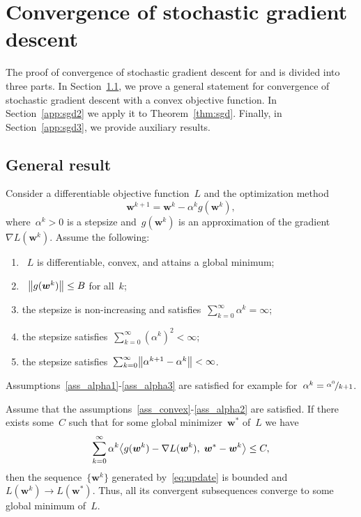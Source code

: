 \section{Convergence of stochastic gradient descent}

The proof of convergence of stochastic gradient descent for \PatMat and \PatMatNP is divided into three parts. In Section~\ref{app:sgd1}, we prove a general statement for convergence of stochastic gradient descent with a convex objective function. In Section~\ref{app:sgd2} we apply it to Theorem~\ref{thm:sgd}. Finally, in Section~\ref{app:sgd3}, we provide auxiliary results.

\subsection{General result}\label{app:sgd1}

Consider a differentiable objective function~$L$ and the optimization method
\begin{equation}\label{eq:update}
  \bm{w}^{k+1} = \bm{w}^k - \alpha^k g(\bm{w}^k),
\end{equation}
where~$\alpha^k > 0$ is a stepsize and~$g(\bm{w}^k)$ is an approximation of the gradient~$\nabla L(\bm{w}^k)$. Assume the following:
\begin{enumerate}[label={(\textbf{A\arabic*})}, left = 15pt]
  \item \label{ass_convex}~$L$ is differentiable, convex, and attains a global minimum;
  \item \label{ass_gbound}~$\norm{g(\bm{w}^k)}\leq B$ for all~$k$;
  \item \label{ass_alpha1} the stepsize is non-increasing and satisfies~$\sum_{k=0}^\infty \alpha^k = \infty$;
  \item \label{ass_alpha2} the stepsize satisfies~$\sum_{k=0}^\infty (\alpha^k)^2<\infty$;
  \item \label{ass_alpha3} the stepsize satisfies~$\sum_{k=0}^\infty \norm{\alpha^{k+1}-  \alpha^k}<\infty$.
\end{enumerate}
Assumptions~\ref{ass_alpha1}-\ref{ass_alpha3} are satisfied for example for~$\alpha^k = \nicefrac{\alpha^0}{k+1}$.

\begin{theorem}\label{thm:convergence}
  Assume that the assumptions~\ref{ass_convex}-\ref{ass_alpha2} are satisfied. If there exists some~$C$ such that for some global minimizer~$\bm{w}^*$ of~$L$ we have
  \begin{equation}\label{eq:nec_cond}
    \sum_{k=0}^\infty \alpha^k \inner{g(\bm{w}^k) - \nabla L(\bm{w}^k)}{\bm{w}^* - \bm{w}^k} \leq C,
  \end{equation}
  then the sequence~$\{\bm{w}^k\}$ generated by~\eqref{eq:update} is bounded and~$L(\bm{w}^k) \to L(\bm{w}^*)$. Thus, all its convergent subsequences converge to some global minimum of~$L$.
\end{theorem}

